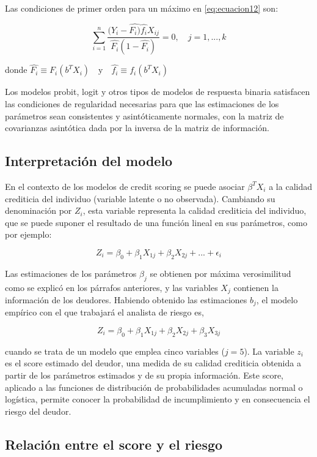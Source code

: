 \documentclass[
  12pt,
]{krantz}
\theoremstyle{definition}
\theoremstyle{definition}
\theoremstyle{definition}
\theoremstyle{remark}
\begin{document}
Las condiciones de primer orden para un máximo en \eqref{eq:ecuacion12} son:

\[\sum_{i=1}^n\frac{(Y_i-\hat{F_i)}\hat{f_i}X_{ij}}{\hat{F_i}(1-\hat{F_i})}=0,\quad j=1,...,k
\label{eq:ecuacion13}\]

donde \(\hat{F_i}\equiv F_i(b^TX_i) \quad \textrm{y} \quad \hat{f_i}\equiv f_i(b^TX_i)\)

Los modelos probit, logit y otros tipos de modelos de respuesta binaria satisfacen las condiciones de regularidad necesarias para que las estimaciones de los parámetros sean consistentes y asintóticamente normales, con la matriz de covarianzas asintótica dada por la inversa de la matriz de información.

\hypertarget{interpretacion-del-modelo}{%
\subsection{Interpretación del modelo}\label{interpretacion-del-modelo}}

En el contexto de los modelos de credit scoring se puede asociar \(\beta^TX_i\) a la calidad crediticia del individuo (variable latente o no observada). Cambiando su denominación por \(Z_i\), esta variable representa la calidad crediticia del individuo, que se puede suponer el resultado de una función lineal en sus parámetros, como por ejemplo:

\[Z_i=\beta_0+\beta_1X_{1j}+\beta_2X_{2j}+...+\epsilon_i
\label{eq:ecuacion14}\]

Las estimaciones de los parámetros \(\beta_j\) se obtienen por máxima verosimilitud como se explicó en los párrafos anteriores, y las variables \(X_j\) contienen la información de los deudores. Habiendo obtenido las estimaciones \(b_j\), el modelo empírico con el que trabajará el analista de riesgo es,

\[Z_i=\beta_0+\beta_1X_{1j}+\beta_2X_{2j}+\beta_3X_{3j}
\label{eq:ecuacion15}\]

cuando se trata de un modelo que emplea cinco variables (\(j=5\)). La variable \(z_i\) es el score estimado del deudor, una medida de su calidad crediticia obtenida a partir de los parámetros estimados y de su propia información. Este score, aplicado a las funciones de distribución de probabilidades acumuladas normal o logística, permite conocer la probabilidad de incumplimiento y en consecuencia el riesgo del deudor.

\hypertarget{relacion-entre-el-score-y-el-riesgo}{%
\subsection{Relación entre el score y el riesgo}\label{relacion-entre-el-score-y-el-riesgo}}
\end{document}
